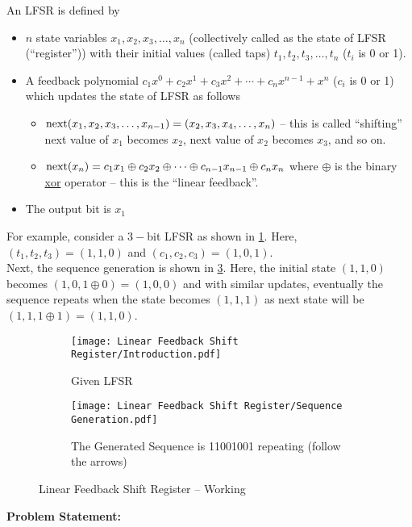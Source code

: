 An LFSR is defined by
\begin{itemize}	
	\item $n$ state variables $x_1, x_2, x_3,\ldots, x_n$ (collectively called as the state of LFSR (``register'')) with their initial values (called taps) $t_1, t_2, t_3,\ldots, t_n$ ($t_i$ is 0 or 1).
	\item A feedback polynomial $c_1x^0 + c_2x^1 + c_3x^2 + \cdots +  c_nx^{n-1} + x^n$ ($c_i$ is 0 or 1) which updates the state of LFSR as follows
	\begin{itemize}
		\item $\operatorname{next}(x_1, x_2, x_3,\ldots, x_{n-1}) = (x_2, x_3, x_4,\ldots, x_n)$ -- this is called ``shifting'' next value of $x_1$ becomes $x_2$, next value of $x_2$ becomes $x_3$, and so on.
		\item $\operatorname{next}(x_n) =  c_1x_1 \oplus c_2x_2 \oplus \cdots \oplus c_{n-1}x_{n-1}\oplus c_nx_n$ where $\oplus$ is the binary \href{https://en.wikipedia.org/wiki/Exclusive_or}{xor} operator -- this is the ``linear feedback''.
	\end{itemize}
	\item The output bit is $x_1$
\end{itemize}
For example, consider a $3-$bit LFSR as shown in \ref{fig:lfsrintro}. Here, $(t_1,t_2,t_3)=(1,1,0)$ and $(c_1,c_2,c_3)=(1,0,1)$.\\
Next, the sequence generation is shown in \ref{fig:lfsrgeneration}. Here, the initial state $(1,1,0)$ becomes $(1,0,1\oplus0) = (1,0,0)$ and with similar updates, eventually the sequence repeats when the state becomes $(1,1,1)$ as next state will be $(1,1,1\oplus1) = (1,1,0)$.
\begin{figure}[H]
	\centering
	\begin{subfigure}[c]{0.4\linewidth}
		\centering
		\texttt{[image: Linear Feedback Shift Register/Introduction.pdf]}
		\caption{Given LFSR}
		\label{fig:lfsrintro}
	\end{subfigure}
	\begin{subfigure}[c]{0.45\linewidth}
		\centering
		\texttt{[image: Linear Feedback Shift Register/Sequence Generation.pdf]}
		\caption{The Generated Sequence is 11001001 repeating (follow the arrows)}
		\label{fig:lfsrgeneration}
	\end{subfigure}
	\caption{Linear Feedback Shift Register -- Working}
\end{figure}
\vspace{-2em}
\textbf{Problem Statement:}\\
